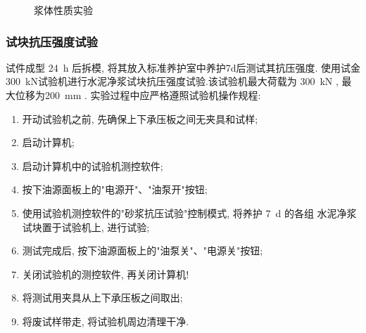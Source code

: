 \begin{figure}
  \centering
  \quad
  \caption{浆体性质实验}
\end{figure}

\subsubsection{试块抗压强度试验}
试件成型 \SI{24}{\hour} 后拆模, 将其放入标准养护室中养护7d后测试其抗压强度.
使用试金\SI{300}{\kilo\newton}试验机进行水泥净浆试块抗压强度试验.该试验机最大荷载为 \SI{300}{\kilo\newton} , 最大位移为\SI{200}{\milli\meter} .
实验过程中应严格遵照试验机操作规程:
\begin{enumerate}[wide, labelwidth=!, labelindent=0pt]
  \item 开动试验机之前, 先确保上下承压板之间无夹具和试样;
  \item 启动计算机;
  \item 启动计算机中的试验机测控软件;
  \item 按下油源面板上的"电源开"、"油泵开"按钮;
  \item 使用试验机测控软件的"砂浆抗压试验"控制模式, 将养护 \SI{7}{\day} 的各组  水泥净浆试块置于试验机上, 进行试验;
  \item 测试完成后, 按下油源面板上的"油泵关"、"电源关"按钮;
  \item 关闭试验机的测控软件, 再关闭计算机!
  \item 将测试用夹具从上下承压板之间取出;
  \item 将废试样带走, 将试验机周边清理干净.
\end{enumerate}

